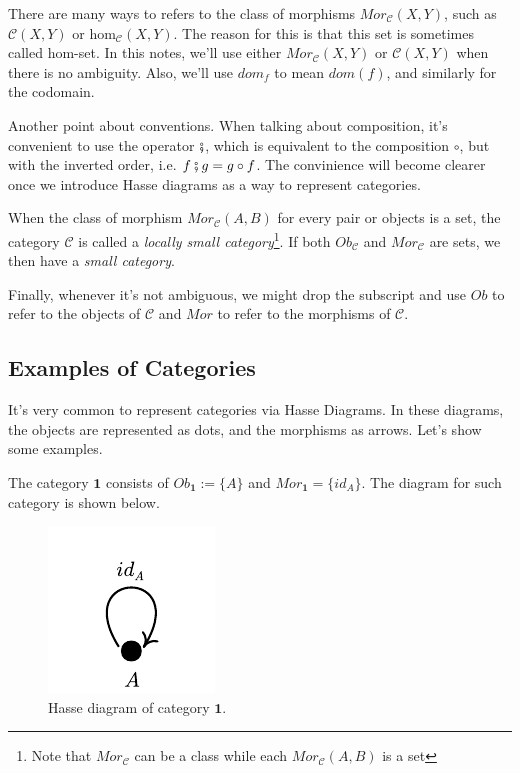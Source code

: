 There are many ways to refers to the class of morphisms $Mor_\mathcal C (X,Y)$, such as
$\mathcal C(X,Y)$ or $\text{hom}_\mathcal C (X,Y)$. The reason for this is that
this set is sometimes called hom-set. In this notes, we'll use either $Mor_\mathcal C (X,Y)$
or $\mathcal C (X,Y)$ when there is no ambiguity. Also, we'll use $dom_f$ to mean $dom(f)$,
and similarly for the codomain.

Another point about conventions. When talking about composition, it's convenient
to use the operator $\fatsemi$, which is equivalent to the composition $\circ$,
but with the inverted order, i.e. $f \fatsemi g = g \circ f$. The convinience
will become clearer once we introduce Hasse diagrams as a way to represent categories.

When the class of morphism $Mor_\mathcal C(A,B)$ for every pair or objects is a set,
the category $\mathcal C$ is called a \textit{locally small category}\footnote{Note
that $Mor_\mathcal C$ can be a class while each $Mor_\mathcal C(A,B)$ is a set}.
If both $Ob_\mathcal C$ and $Mor_\mathcal C$ are sets, we then have a \textit{small category}.

Finally, whenever it's not ambiguous, we might drop the subscript and use $Ob$
to refer to the objects of $\mathcal C$ and $Mor$ to refer to the morphisms of $\mathcal C$.

\subsection{Examples of Categories}

It's very common to represent categories via Hasse Diagrams. In these diagrams, the
objects are represented as dots, and the morphisms as arrows. Let's show some examples.

\begin{example}[Category $\bm 1$]
  The category $\bm 1$ consists of $Ob_{\bm 1} := \{A\}$ and $Mor_{\bm 1} = \{id_A\}$.
  The diagram for such category is shown below.
  \begin{figure}[H]
    \begin{center}
      \includegraphics{./notebooks/1Cat}
    \end{center}
    \caption{Hasse diagram of category $\bm 1$.}
    \label{fig:1Cat}
  \end{figure}
\end{example}

